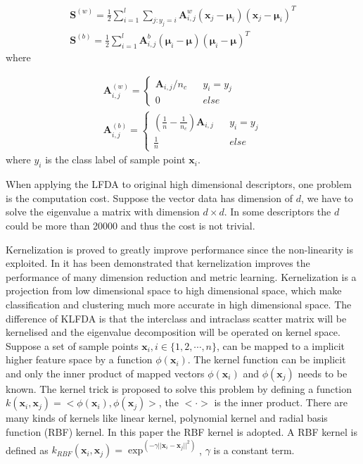 \documentclass[conference,compsoc]{IEEEtran}
\begin{document}
\begin{equation}
\begin{aligned}
\bm{S}^{(w)} = \frac{1}{2}\sum _{i=1}^l\sum_{j:y_j = i} \bm{A}_{i,j}^w (\bm{x}_j - \bm{\mu}_i)(\bm{x}_j - \bm{\mu}_i)^T \\
\bm{S}^{(b)} =  \frac{1}{2}\sum _{i=1}^l \bm{A}_{i,j}^b(\bm{\mu}_i - \bm{\mu})(\bm{\mu}_i - \bm{\mu})^T
\end{aligned}
\end{equation}
where 

\begin{equation}
\begin{aligned}
\bm{A}_{i,j}^{(w)} = \left \{ 
\begin{array}{rcl}
\bm{A}_{i,j}/n_c &  &y_i = y_j \\
0 & & else
\end{array}
  \right.  \\
  \bm{A}_{i,j}^{(b)} = \left \{ 
\begin{array}{rcl}
(\frac{1}{n} - \frac{1}{n_c})  \bm{A}_{i,j} &  &{y_i = y_j }\\
\frac{1}{n} & & {else}
\end{array}
  \right. 
 \end{aligned}
\end{equation}
where $y_i$ is the class label of sample point $\bm{x}_i$.
  
When applying the LFDA to original high dimensional descriptors, one problem is the computation cost. Suppose the vector data has dimension of $d$, we have to solve the eigenvalue a matrix with dimension $d\times d$. In some descriptors the $d$ could be more than 20000 and thus the cost is not trivial. 
 
 
 Kernelization is proved to greatly improve performance since the non-linearity is exploited. In \cite{KernelVersionMetrics} it has been demonstrated that kernelization improves the performance of many dimension reduction and metric learning. Kernelization is a projection from low dimensional space to high dimensional space, which make classification and clustering much more accurate in high dimensional space.  The difference of KLFDA is that the interclass and intraclass scatter matrix will be kernelised and the eigenvalue decomposition will be operated on kernel space.  Suppose a set of sample points $\bm{x}_i, i\in\{1,2,\cdots, n\} $, can be mapped to a implicit higher feature space by a function $\phi(\bm{x}_i)$. The kernel function can be implicit and only the inner product of mapped vectors $\phi(\bm{x}_i)$ and $\phi(\bm{x}_j)$ needs to be known. The kernel trick is proposed to solve this problem by defining a function $k(\bm{x}_i,\bm{x}_j) = <\phi(\bm{x}_i),\phi(\bm{x}_j)>$, the $< \cdot >$ is the inner product. There are many kinds of kernels like linear kernel, polynomial kernel and radial basis function (RBF) kernel. In this paper the RBF kernel is adopted. A RBF kernel is defined as $k_{RBF}(\bm{x}_i,\bm{x}_j) = \exp^{(-\gamma||\bm{x}_i-\bm{x}_j||^2)}$, $\gamma$ is a constant term. 
 
\end{document}
